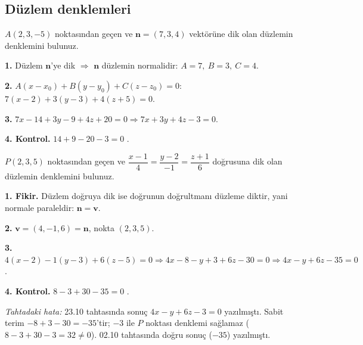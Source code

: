 \subsection{Düzlem denklemleri}

\begin{soru}
$A(2,3,-5)$ noktasından geçen ve $\mathbf n=(7,3,4)$ vektörüne dik olan düzlemin denklemini bulunuz.
\end{soru}
\begin{cevap}
\textbf{1.} Düzlem $\mathbf n$'ye dik $\Rightarrow$ $\mathbf n$ düzlemin normalidir: $A=7,\ B=3,\ C=4$.

\textbf{2.} $A(x-x_0)+B(y-y_0)+C(z-z_0)=0$:\quad $7(x-2)+3(y-3)+4(z+5)=0$.

\textbf{3.} $7x-14+3y-9+4z+20=0\Rightarrow\boxed{7x+3y+4z-3=0}$.

\textbf{4. Kontrol.} $14+9-20-3=0$ \checkmark.
\end{cevap}

\begin{soru}
$P(2,3,5)$ noktasından geçen ve $\dfrac{x-1}{4}=\dfrac{y-2}{-1}=\dfrac{z+1}{6}$ doğrusuna dik olan düzlemin denklemini bulunuz.
\end{soru}
\begin{cevap}
\textbf{1. Fikir.} Düzlem doğruya dik ise doğrunun doğrultmanı düzleme diktir, yani normale paraleldir: $\mathbf n=\mathbf v$.

\textbf{2.} $\mathbf v=(4,-1,6)=\mathbf n$, nokta $(2,3,5)$.

\textbf{3.} $4(x-2)-1(y-3)+6(z-5)=0\Rightarrow4x-8-y+3+6z-30=0\Rightarrow\boxed{4x-y+6z-35=0}$.

\textbf{4. Kontrol.} $8-3+30-35=0$ \checkmark.

\textit{Tahtadaki hata:} 23.10 tahtasında sonuç $4x-y+6z-3=0$ yazılmıştı. Sabit terim $-8+3-30=-35$'tir; $-3$ ile $P$ noktası denklemi sağlamaz ($8-3+30-3=32\neq0$). 02.10 tahtasında doğru sonuç ($-35$) yazılmıştı.
\end{cevap}

